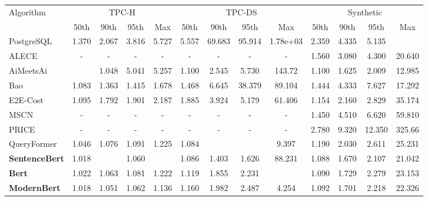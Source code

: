 \begin{tabular}{l|cccc|cccc|cccc}

\toprule

\multirow{2}{*}{Algorithm} & \multicolumn{4}{c|}{TPC-H} & \multicolumn{4}{c|}{TPC-DS} & \multicolumn{4}{c|}{Synthetic} \\

 & 50th & 90th & 95th & Max & 50th & 90th & 95th & Max & 50th & 90th & 95th & Max \\

\midrule

PostgreSQL & 1.370 & 2.067 & 3.816 & 5.727 & 5.557 & 69.683 & 95.914 & 1.78e+03 & 2.359 & 4.335 & 5.135 & \cellcolor{green2}{9.657} \\
ALECE & - & - & - & - & - & - & - & - & 1.560 & 3.080 & 4.300 & 20.640 \\
AiMeetsAi & \cellcolor{green4}{1.015} & 1.048 & 5.041 & 5.257 & 1.100 & 2.545 & 5.730 & 143.72 & 1.100 & 1.625 & 2.009 & 12.985 \\
Bao & 1.083 & 1.363 & 1.415 & 1.678 & 1.468 & 6.645 & 38.379 & 89.104 & 1.444 & 4.333 & 7.627 & 17.292 \\
E2E-Cost & 1.095 & 1.792 & 1.901 & 2.187 & 1.885 & 3.924 & 5.179 & 61.406 & 1.154 & 2.160 & 2.829 & 35.174 \\
MSCN & - & - & - & - & - & - & - & - & 1.450 & 4.510 & 6.620 & 59.810 \\
PRICE & - & - & - & - & - & - & - & - & 2.780 & 9.320 & 12.350 & 325.66 \\
QueryFormer & 1.046 & 1.076 & 1.091 & 1.225 & 1.084 & \cellcolor{green5}{1.284} & \cellcolor{green5}{1.393} & 9.397 & 1.190 & 2.030 & 2.611 & 25.231 \\
\midrule

\textbf{SentenceBert} & 1.018 & \cellcolor{green1}{1.044} & 1.060 & \cellcolor{green5}{1.122} & 1.086 & 1.403 & 1.626 & 88.231 & 1.088 & 1.670 & 2.107 & 21.042 \\
\textbf{Bert} & 1.022 & 1.063 & 1.081 & 1.222 & 1.119 & 1.855 & 2.231 & \cellcolor{green3}{3.488} & 1.090 & 1.729 & 2.279 & 23.153 \\
\textbf{ModernBert} & 1.018 & 1.051 & 1.062 & 1.136 & 1.160 & 1.982 & 2.487 & 4.254 & 1.092 & 1.701 & 2.218 & 22.326 \\
\midrule


\end{tabular}
